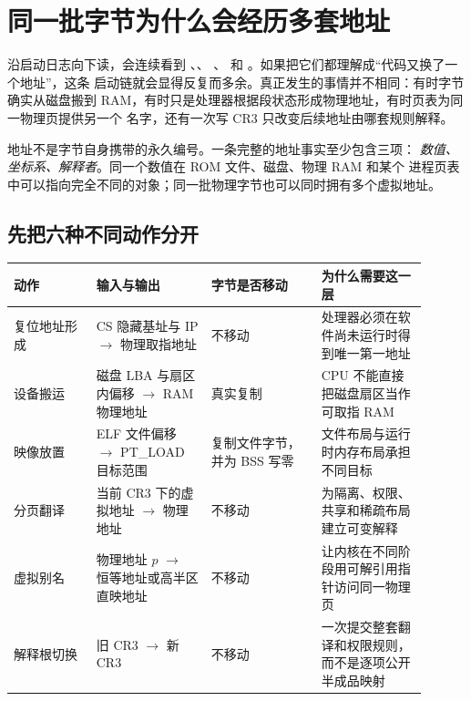 \section{同一批字节为什么会经历多套地址}

沿启动日志向下读，会连续看到 、、
、 和
。如果把它们都理解成“代码又换了一个地址”，这条
启动链就会显得反复而多余。真正发生的事情并不相同：有时字节确实从磁盘搬到
RAM，有时只是处理器根据段状态形成物理地址，有时页表为同一物理页提供另一个
名字，还有一次写 CR3 只改变后续地址由哪套规则解释。

\begin{keyidea}
地址不是字节自身携带的永久编号。一条完整的地址事实至少包含三项：
\emph{数值、坐标系、解释者}。同一个数值在 ROM 文件、磁盘、物理 RAM 和某个
进程页表中可以指向完全不同的对象；同一批物理字节也可以同时拥有多个虚拟地址。
\end{keyidea}

\subsection{先把六种不同动作分开}

\begin{longtable}{|L{0.18\linewidth}|L{0.25\linewidth}|L{0.24\linewidth}|L{0.23\linewidth}|}
\toprule
动作 & 输入与输出 & 字节是否移动 & 为什么需要这一层 \\
\midrule
复位地址形成 &
CS 隐藏基址与 IP \(\rightarrow\) 物理取指地址 &
不移动 &
处理器必须在软件尚未运行时得到唯一第一地址 \\\tablerowrule
设备搬运 &
磁盘 LBA 与扇区内偏移 \(\rightarrow\) RAM 物理地址 &
真实复制 &
CPU 不能直接把磁盘扇区当作可取指 RAM \\\tablerowrule
映像放置 &
ELF 文件偏移 \(\rightarrow\) PT\_LOAD 目标范围 &
复制文件字节，并为 BSS 写零 &
文件布局与运行时内存布局承担不同目标 \\\tablerowrule
分页翻译 &
当前 CR3 下的虚拟地址 \(\rightarrow\) 物理地址 &
不移动 &
为隔离、权限、共享和稀疏布局建立可变解释 \\\tablerowrule
虚拟别名 &
物理地址 \(p\) \(\rightarrow\) 恒等地址或高半区直映地址 &
不移动 &
让内核在不同阶段用可解引用指针访问同一物理页 \\\tablerowrule
解释根切换 &
旧 CR3 \(\rightarrow\) 新 CR3 &
不移动 &
一次提交整套翻译和权限规则，而不是逐项公开半成品映射 \\
\bottomrule
\end{longtable}

